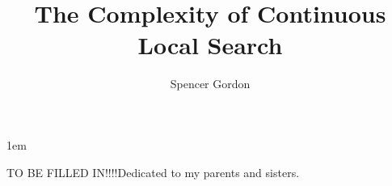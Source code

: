 \documentclass[draftthesis,tocnosub,noragright,centerchapter,12pt,mixcasechap]{uiucecethesis09}
\title{The Complexity of Continuous Local Search}
\author{Spencer Gordon}
\theoremstyle{plain}
\theoremstyle{definition}
\begin{document}
%
\maketitle

\parindent 1em%

\frontmatter

%
\begin{abstract}

\end{abstract}


%
\begin{dedication}
TO BE FILLED IN!!!!Dedicated to my parents and sisters.
\end{dedication}

%
\begin{acknowledgments}
\end{acknowledgments}

%
\tableofcontents

%



%
\end{document}
